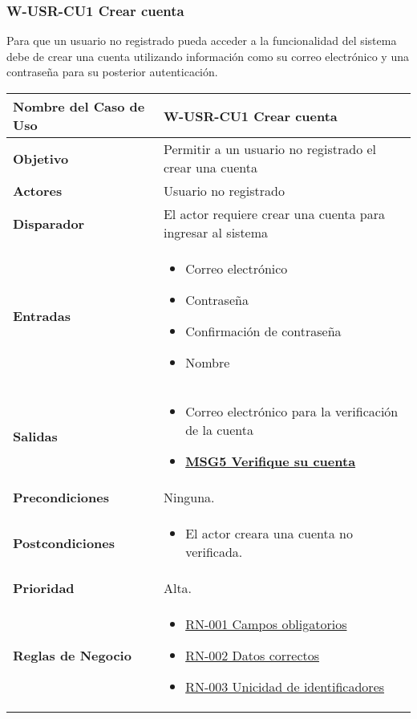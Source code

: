 \subsubsection{W-USR-CU1 Crear cuenta}
Para que un usuario no registrado pueda acceder a la funcionalidad del sistema debe de crear una cuenta utilizando información como su correo electrónico y una contraseña para su posterior autenticación.
\begin{longtable}{|J{5cm}|J{10.3cm}|}
	\hline
	\textbf{Nombre del Caso de Uso} &
		W-USR-CU1 Crear cuenta \\ \hline
	\textbf{Objetivo} &
		Permitir a un usuario no registrado el crear una cuenta \\ \hline
	\textbf{Actores} &
		Usuario no registrado \\ \hline 
	\textbf{Disparador} & 
		El actor requiere crear una cuenta para ingresar al sistema \\ \hline 
	\textbf{Entradas} & 
		\begin{itemize}
				\item Correo electrónico
				\item Contraseña
			    \item Confirmación de contraseña
			    \item Nombre
		\end{itemize}\\ \hline 
	\textbf{Salidas} & 
	    \begin{itemize}
		\item Correo electrónico para la verificación de la cuenta
		\item \hyperref[MSG5]{\bf MSG5 Verifique su cuenta}
		\end{itemize} \\ \hline
	\textbf{Precondiciones} &
        Ninguna. \\ \hline
	\textbf{Postcondiciones} &
		\begin{itemize}
			\item El actor creara una cuenta no verificada.
		\end{itemize}\\ \hline
	\textbf{Prioridad} & 
		Alta. \\ \hline
	\textbf{Reglas de Negocio} & 
		\begin{itemize}
			\item \hyperref[RN001]{RN-001 Campos obligatorios}
			\item \hyperref[RN002]{RN-002 Datos correctos}
			\item \hyperref[RN003]{RN-003 Unicidad de identificadores}
		\end{itemize} \\ \hline

\end{longtable}
